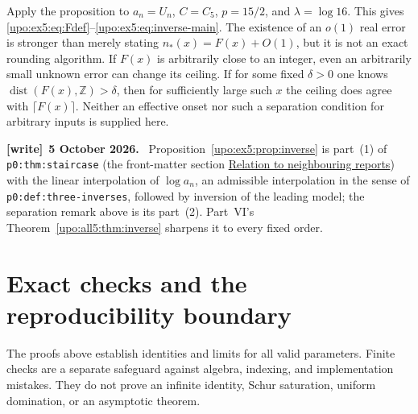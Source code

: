\documentclass[11pt,letterpaper]{article}
\theoremstyle{remark}\newtheorem{remark}[theorem]{Remark}
\numberwithin{equation}{section}
\newenvironment{writenote}[1][]{\par\smallskip\begingroup\small
 \noindent\textbf{[write]}\if\relax\detokenize{#1}\relax\else~\textbf{#1.}\fi\ }%
 {\par\endgroup\smallskip}
\begin{document}
Apply the proposition to $a_n=U_n$, $C=C_5$, $p=15/2$, and
$\lambda=\log16$. This gives \eqref{upo:ex5:eq:Fdef}--\eqref{upo:ex5:eq:inverse-main}.
The existence of an $o(1)$ real error is stronger than merely stating
$n_*(x)=F(x)+O(1)$, but it is not an exact rounding algorithm.
If $F(x)$ is arbitrarily close to an integer, even an arbitrarily
small unknown error can change its ceiling. If for some fixed
$\delta>0$ one knows $\operatorname{dist}(F(x),\mathbb Z)>\delta$,
then for sufficiently large such $x$ the ceiling does agree with
$\lceil F(x)\rceil$. Neither an effective onset nor such a separation
condition for arbitrary inputs is supplied here.
\begin{writenote}[5 October 2026]
Proposition~\ref{upo:ex5:prop:inverse} is part~(1) of \texttt{p0:thm:staircase} (the front-matter section \hyperref[upo:sec:neighbours]{Relation to neighbouring reports}) with the linear interpolation of $\log a_n$, an admissible interpolation in the sense of \texttt{p0:def:three-inverses}, followed by inversion of the leading model; the separation remark above is its part~(2). Part~VI's Theorem~\ref{upo:all5:thm:inverse} sharpens it to every fixed order.
\end{writenote}

\section{Exact checks and the reproducibility boundary}\label{upo:ex5:sec:checks}
The proofs above establish identities and limits for all valid
parameters. Finite checks are a separate safeguard against algebra,
indexing, and implementation mistakes. They do not prove an
infinite identity, Schur saturation, uniform domination, or an
asymptotic theorem.
\end{document}
